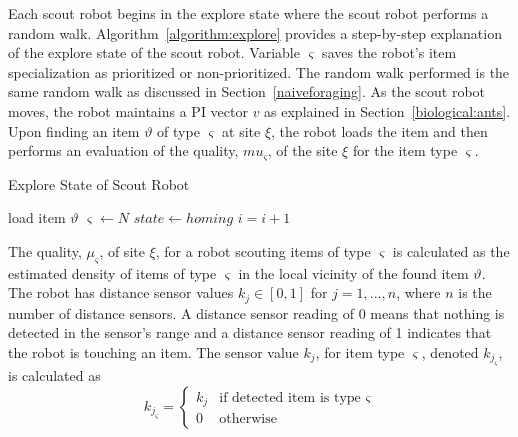 Each scout robot begins in the explore state where the scout robot performs a random walk. Algorithm~\ref{algorithm:explore} provides a step-by-step explanation of the explore state of the scout robot. Variable $\varsigma$ saves the robot's item specialization as prioritized or non-prioritized. The random walk performed is the same random walk as discussed in Section~\ref{naiveforaging}. As the scout robot moves, the robot maintains a PI vector $v$ as explained in Section~\ref{biological:ants}. Upon finding an item $\vartheta$ of type $\varsigma$ at site $\xi$, the robot loads the item and then performs an evaluation of the quality, $mu_\varsigma$, of the site $\xi$ for the item type $\varsigma$. 


\begin{algorithm}
\caption{Explore State of Scout Robot}
\label{algorithm:explore}
\begin{algorithmic}[1]
\State {}
\State {}

 	\State {}
	\State load item $\vartheta$
	\State $\varsigma \gets N$
	\State $state \gets homing$
\EndIf
\State $i = i + 1$
\EndFunction
\end{algorithmic}
\end{algorithm}

The quality, $\mu_\varsigma$, of site $\xi$, for a robot scouting items of type $\varsigma$ is calculated as the estimated density of items of type $\varsigma$ in the local vicinity of the found item $\vartheta$. The robot has distance sensor values $k_j\in[0,1]$ for $j = 1,...,n$, where $n$ is the number of distance sensors. A distance sensor reading of 0 means that nothing is detected in the sensor's range and a distance sensor reading of 1 indicates that the robot is touching an item. The sensor value $k_j$, for item type $\varsigma$, denoted $k_{j_\varsigma}$, is calculated as 
\begin{equation}
\label{densitytype}
k_{j_\varsigma}=
    \begin{cases}
      k_j & \text{if detected item is type $\varsigma$} \\
      0 & \text{otherwise}
    \end{cases}
\end{equation}

